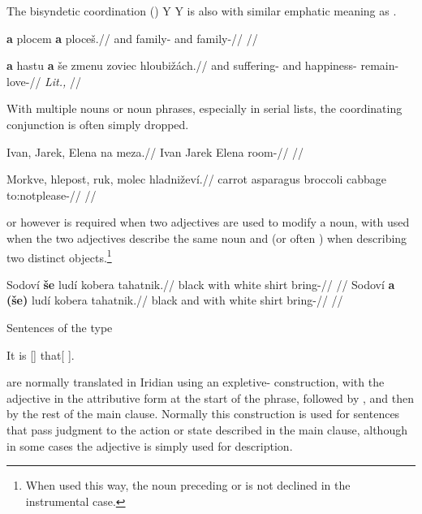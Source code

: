The bisyndetic coordination (\cite{velupillai2012})  Y  Y is also with similar emphatic meaning as .

\pex
\begingl
    \gla \textbf{a} plocem \textbf{a} ploceš.//
    \glb and family- and family-//
    \glft {}//
\endgl
\xe

\pex
\begingl
    \gla \textbf{a} hastu \textbf{a} še zmenu zoviec hloubižách.//
    \glb and suffering-\mk{} and  happiness- remain- love-//
    \glft {} \emph{Lit.,} //
\endgl
\xe

With multiple nouns or noun phrases, especially in serial lists, the coordinating conjunction is often simply dropped.

\pex
\begingl
    \gla Ivan, Jarek, Elena na meza.//
    \glb Ivan Jarek Elena  room-//
    \glft {}//
\endgl
\xe

\pex
\begingl
    \gla Morkve, hlepost, ruk, molec hladniževí.//
    \glb carrot asparagus broccoli cabbage to:notplease-//
    \glft {}//
\endgl
\xe

 or  however is required when two adjectives are used to modify a noun, with  used when the two adjectives describe the same noun and  (or often ) when describing two distinct objects.\footnote{When used this way, the noun preceding  or  is not declined in the instrumental case.}

\pex
\a
\begingl
    \gla Sodoví \textbf{še} ludí kobera tahatnik.//
    \glb black with white shirt bring-//
    \glft {}//
\endgl
\a
\begingl
    \gla Sodoví \textbf{a} \textbf{(še)} ludí kobera tahatnik.//
    \glb black and with white shirt bring-//
    \glft {}//
\endgl
\xe

Sentences of the type

\ex
It is [] that[ ].
\xe

are normally translated in Iridian using an expletive- construction, with the adjective in the attributive form at the start of the phrase, followed by , and then by the rest of the main clause. Normally this construction is used for sentences that pass judgment to the action or state described in the main clause, although in some cases the adjective is simply used for description.

